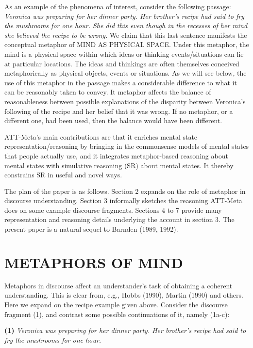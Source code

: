 As an example of the phenomena of interest, consider the following passage:
{\it Veronica was preparing for her dinner party.  Her brother's recipe had
said to fry the mushrooms for one hour. She did this even though in the
recesses of her mind she believed the recipe to be wrong.} We claim that this
last sentence manifests the conceptual metaphor of MIND AS PHYSICAL SPACE.
Under this metaphor, the mind is a physical space within which ideas or
thinking events/situations can lie at particular locations. The ideas and
thinkings are often themselves conceived metaphorically as physical objects,
events or situations. As we will see below, the use of this metaphor in the
passage makes a considerable difference to what it can be reasonably taken to
convey.  It metaphor affects the balance of reasonableness between possible
explanations of the disparity between Veronica's following of the recipe and
her belief that it was wrong. If no metaphor, or a different one, had been
used, then the balance would have been different.

ATT-Meta's main contributions are that it enriches mental state
representation/reasoning by bringing in the commonsense models of mental states
that people actually use, and it integrates metaphor-based reasoning about
mental states with simulative reasoning (SR) about mental states. It thereby
constrains SR in useful and novel ways.

The plan of the paper is as follows.
%
Section 2 expands on the role of metaphor in discourse understanding.
%
Section 3 informally sketches the reasoning ATT-Meta  does on some example discourse fragments.
%
Sections 4 to 7 provide many representation and reasoning details underlying the account in section 3.
The present paper is a natural sequel to Barnden (1989, 1992).


\section{METAPHORS OF MIND} %
 
Metaphors in discourse affect an understander's task of obtaining a coherent
understanding. This is clear from, e.g., Hobbs (1990), Martin (1990) and
others.  Here we expand on the recipe example given above.  Consider the
discourse fragment (1), and contrast some possible continuations of it, namely
(1a-c):

\addtolength{\baselineskip}{-.375\baselineskip}

{\bf (1)}
{\it
Veronica was preparing for her dinner party.  Her brother's recipe had said to
fry the mushrooms for one hour.}

